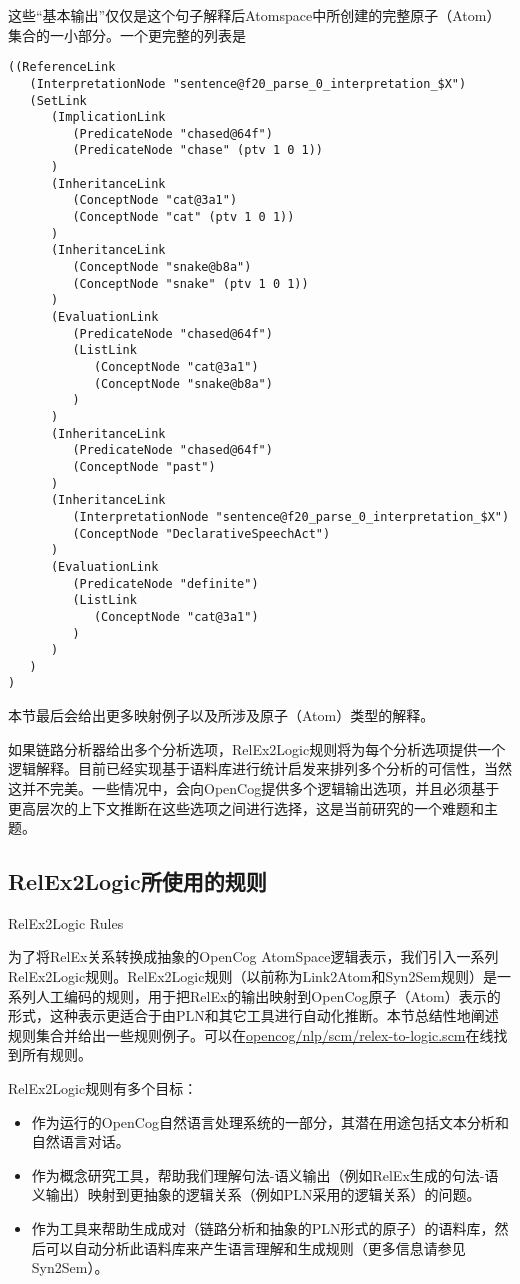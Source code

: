 这些“基本输出”仅仅是这个句子解释后Atomspace中所创建的完整原子（Atom）集合的一小部分。一个更完整的列表是

{\tt\begin{small}\begin{lstlisting}
((ReferenceLink
   (InterpretationNode "sentence@f20_parse_0_interpretation_$X")
   (SetLink
      (ImplicationLink
         (PredicateNode "chased@64f")
         (PredicateNode "chase" (ptv 1 0 1))
      )
      (InheritanceLink
         (ConceptNode "cat@3a1")
         (ConceptNode "cat" (ptv 1 0 1))
      )
      (InheritanceLink
         (ConceptNode "snake@b8a")
         (ConceptNode "snake" (ptv 1 0 1))
      )
      (EvaluationLink
         (PredicateNode "chased@64f")
         (ListLink
            (ConceptNode "cat@3a1")
            (ConceptNode "snake@b8a")
         )
      )
      (InheritanceLink
         (PredicateNode "chased@64f")
         (ConceptNode "past")
      )
      (InheritanceLink
         (InterpretationNode "sentence@f20_parse_0_interpretation_$X")
         (ConceptNode "DeclarativeSpeechAct")
      )
      (EvaluationLink
         (PredicateNode "definite")
         (ListLink
            (ConceptNode "cat@3a1")
         )
      )
   )
)
\end{lstlisting}\end{small}}

本节最后会给出更多映射例子以及所涉及原子（Atom）类型的解释。

如果链路分析器给出多个分析选项，RelEx2Logic规则将为每个分析选项提供一个逻辑解释。目前已经实现基于语料库进行统计启发来排列多个分析的可信性，当然这并不完美。一些情况中，会向OpenCog提供多个逻辑输出选项，并且必须基于更高层次的上下文推断在这些选项之间进行选择，这是当前研究的一个难题和主题。


\subsection{RelEx2Logic所使用的规则}{RelEx2Logic Rules}

为了将RelEx关系转换成抽象的OpenCog AtomSpace逻辑表示，我们引入一系列RelEx2Logic规则。RelEx2Logic规则（以前称为Link2Atom和Syn2Sem规则\cite{Lian2012}）是一系列人工编码的规则，用于把RelEx的输出映射到OpenCog原子（Atom）表示的形式，这种表示更适合于由PLN和其它工具进行自动化推断。本节总结性地阐述规则集合并给出一些规则例子。可以在\url{opencog/nlp/scm/relex-to-logic.scm}在线找到所有规则。

RelEx2Logic规则有多个目标：

\begin{itemize}
\item 作为运行的OpenCog自然语言处理系统的一部分，其潜在用途包括文本分析和自然语言对话。
\item 作为概念研究工具，帮助我们理解句法-语义输出（例如RelEx生成的句法-语义输出）映射到更抽象的逻辑关系（例如PLN采用的逻辑关系）的问题。
\item 作为工具来帮助生成成对（链路分析和抽象的PLN形式的原子）的语料库，然后可以自动分析此语料库来产生语言理解和生成规则（更多信息请参见Syn2Sem）。
\end{itemize}

